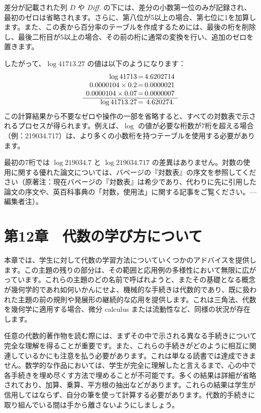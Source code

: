 \documentclass[a4paper,11pt,openany]{ltjsbook}
\begin{document}
差分が記載された列 $D$ や \emph{Diff.} の下には、差分の小数第一位のみが記録され、最初のゼロは省略されます。さらに、第八位が5以上の場合、第七位に1を加算します。また、この表から百分率のテーブルを作成するためには、最後の桁を削除し、最後二桁目が5以上の場合、その前の桁に通常の変換を行い、追加のゼロを置きます。

したがって、$\log 41713.27$ の値は以下のようになります：
\[
\begin{array}{r@{\,}c@{\,}r}
\log 41713 & = & 4.6202714 \\
0.0000104 \times 0.2 & = & 0.0000021 \\
0.0000104 \times 0.07 & = & 0.0000007 \\
\hline
\log 41713.27 & = & 4.620274.
\end{array}
\]
この計算結果から不要なゼロや操作の一部を省略すると、すべての対数表で示されるプロセスが得られます。例えば、$\log$ の値が必要な桁数が7桁を超える場合（例：219034.717）は、より多くの小数桁を持つテーブルを使用する必要があります。

最初の7桁では $\log 219034.7$ と $\log 219034.717$ の差異はありません。対数の使用に関する優れた論文については、バベージの『対数表』の序文を参照してください（原著注：現在バベージの『対数表』は希少であり、代わりに先に引用した論文の序文や、英百科事典の「対数，使用法」に関する記事をご覧ください。---編集者注）。

\chapter{第12章　代数の学び方について}

本章では、学生に対して代数の学習方法についていくつかのアドバイスを提供します。この主題の残りの部分は、その範囲と応用例の多様性において無限に広がっています。これらの主題のどの名前で呼ばれようと、またその基礎となる概念が幾何学的であれ如何いかんにせよ、機械的な手続きは代数的であり、既に扱われた主題の前の規則や発展形の継続的な応用を提供します。これは三角法、代数を幾何学に適用する場合、微分 calculus または流動性など、同様の状況が存在します。

任意の代数的著作物を読む際には、まずその中で示される異なる手続きについて完全な理解を得ることが重要です。また、これらの手続きがどのように相互に関連しているかにも注意を払う必要があります。これは単なる読書では達成できません。数学的な作品においては、学生が完全に理解したと言えるまで、心の中で各手続きを埋め尽くす方法で埋めることが不可能です。多くの結果は詳細が省略されており、加算、乗算、平方根の抽出などがあります。これらの結果は学生が信用してはならず、自分の筆を使って計算する必要があります。代数的手続きに取り組んでいる間は手から離さないようにしましょう。
\end{document}
